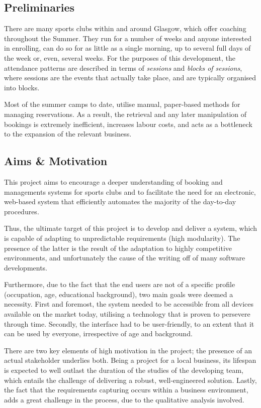\documentclass{l3proj}
\begin{document}
\subsection{Preliminaries}
There are many sports clubs within and around Glasgow, which offer coaching throughout the Summer. They run for a number of weeks and anyone interested in enrolling, can do so for as little as a single morning, up to several full days of the week or, even, several weeks. For the purposes of this development, the attendance patterns are described in terms of \emph{sessions} and \emph{blocks of sessions}, where sessions are the events that actually take place, and are typically organised into blocks.
\par Most of the summer camps to date, utilise manual, paper-based methods for managing reservations. As a result, the retrieval and any later manipulation of bookings is extremely inefficient, increases labour costs, and acts as a bottleneck to the expansion of the relevant business.

\subsection{Aims \& Motivation}
This project aims to encourage a deeper understanding of booking and managements systems for sports clubs and to facilitate the need for an electronic, web-based system that efficiently automates the majority of the day-to-day procedures.
\par
Thus, the ultimate target of this project is to develop and deliver a system, which is capable of adapting to unpredictable requirements (high modularity). The presence of the latter is the result of the adaptation to highly competitive environments, and unfortunately the cause of the writing off of many software developments. \par
Furthermore, due to the fact that the end users are not of a specific profile (occupation, age, educational background), two main goals were deemed a necessity. First and foremost, the system needed to be accessible from all devices available on the market today, utilising a technology that is proven to persevere through time. Secondly, the interface had to be user-friendly, to an extent that it can be used by everyone, irrespective of age and background.\par
There are two key elements of high motivation in the project; the presence of an actual stakeholder underlies both. Being a project for a local business, its lifespan is expected to well outlast the duration of the studies of the developing team, which entails the challenge of delivering a robust, well-engineered solution. Lastly, the fact that the requirements capturing occurs within a business environment, adds a great challenge in the process, due to the qualitative analysis involved.
\end{document}
